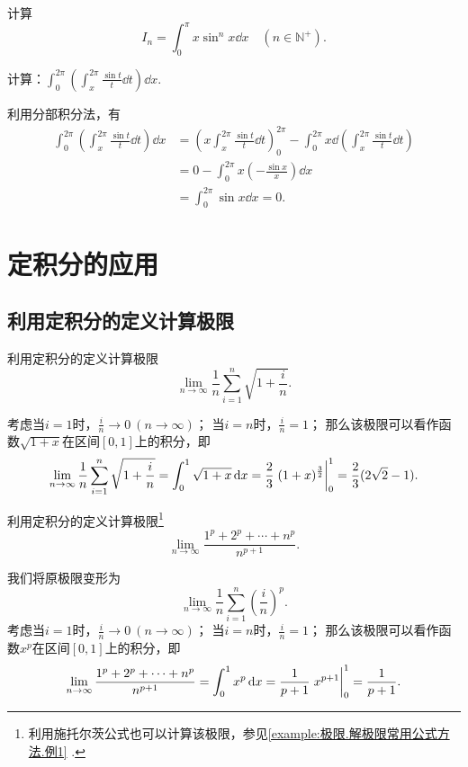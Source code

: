 \begin{example}
计算\[
I_n = \int_0^{\pi} x \sin^n x \dd{x}
\quad(n\in\mathbb{N}^+).
\]
\end{example}

\begin{example}
计算：\(\int_0^{2\pi}\left(\int_x^{2\pi}\frac{\sin t}{t}\dd{t}\right)\dd{x}\).
\begin{solution}
利用分部积分法，有\begin{align*}
\int_0^{2\pi}\left(\int_x^{2\pi}\frac{\sin t}{t}\dd{t}\right)\dd{x}
&= \left(x \int_x^{2\pi}\frac{\sin t}{t}\dd{t}\right)_0^{2\pi}
- \int_0^{2\pi} x \dd(\int_x^{2\pi}\frac{\sin t}{t}\dd{t}) \\
&= 0 - \int_0^{2\pi} x \left(-\frac{\sin x}{x}\right) \dd{x} \\
&= \int_0^{2\pi} \sin x \dd{x} = 0.
\end{align*}
\end{solution}
\end{example}

\section{定积分的应用}
\subsection{利用定积分的定义计算极限}
\begin{example}
\def\l{\lim\limits_{n\to\infty}}%
\def\s{\sum\limits_{i=1}^n}%
利用定积分的定义计算极限\[
\l \frac{1}{n} \s \sqrt{1+\frac{i}{n}}.
\]
\begin{solution}
考虑当\(i=1\)时，\(\frac{i}{n}\to0\ (n\to\infty)\)；%
当\(i=n\)时，\(\frac{i}{n}=1\)；%
那么该极限可以看作函数\(\sqrt{1+x}\)在区间\([0,1]\)上的积分，即\[
\l \frac{1}{n} \s \sqrt{1+\frac{i}{n}}
= \int_0^1 \sqrt{1+x} \dd{x}
= \frac{2}{3} \eval{(1+x)^{\frac{3}{2}}}_0^1
= \frac{2}{3} (2\sqrt{2}-1).
\]
\end{solution}
\end{example}

\begin{example}
\def\l{\lim\limits_{n\to\infty}}%
\def\s{\sum\limits_{i=1}^n}%
利用定积分的定义计算极限\footnote{利用施托尔茨公式也可以计算该极限，参见\cref{example:极限.解极限常用公式方法.例1} .}\[
\l \frac{1^p + 2^p + \dotsb + n^p}{n^{p+1}}.
\]
\begin{solution}
我们将原极限变形为\[
\l \frac{1}{n} \s \left(\frac{i}{n}\right)^p.
\]考虑当\(i=1\)时，\(\frac{i}{n}\to0\ (n\to\infty)\)；%
当\(i=n\)时，\(\frac{i}{n}=1\)；%
那么该极限可以看作函数\(x^p\)在区间\([0,1]\)上的积分，即\[
\l \frac{1^p + 2^p + \dotsb + n^p}{n^{p+1}}
= \int_0^1 x^p \dd{x}
= \frac{1}{p+1} \eval{x^{p+1}}_0^1
= \frac{1}{p+1}.
\]
\end{solution}
\end{example}

